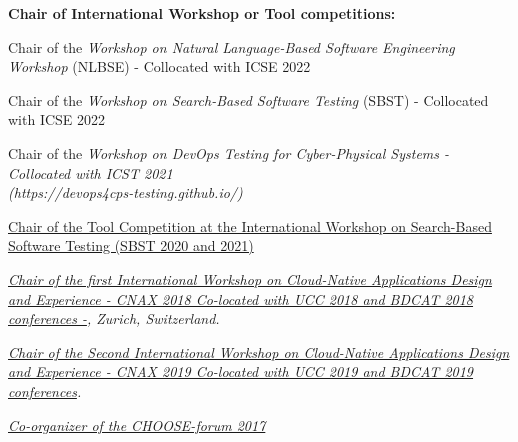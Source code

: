 \documentclass[10pt]{article}
\begin{document}
\textbf{Chair of International Workshop or Tool competitions:}
\begin{innerlist}
\item Chair of the \textit{Workshop on Natural Language-Based Software Engineering Workshop} (NLBSE) - Collocated with ICSE 2022
\item Chair of  the \textit{Workshop on Search-Based Software Testing} (SBST) - Collocated with ICSE 2022
\item Chair of the \textit{Workshop on DevOps Testing for Cyber-Physical Systems - Collocated with ICST 2021 \\(https://devops4cps-testing.github.io/)} 
\item \href{}
{Chair of the Tool Competition at the 
International Workshop on Search-Based Software Testing (SBST 2020 and 2021)} 
       \item \emph{\href{http://cnax.servicelaboratory.ch/}
                   {\textit{Chair of the first International Workshop on Cloud-Native Applications Design and Experience - CNAX 2018
Co-located with UCC 2018 and BDCAT 2018 conferences -}}, Zurich, Switzerland.}

       \item \emph{\href{}
                   {\textit{Chair of the Second International Workshop on Cloud-Native Applications Design and Experience - CNAX 2019
Co-located with UCC 2019 and BDCAT 2019 conferences}}.}
\item \textit{\href{http://www.choose.s-i.ch/events/forum2017/index.html}{Co-organizer of the CHOOSE-forum 2017}} 
\end{innerlist}
\end{document}
